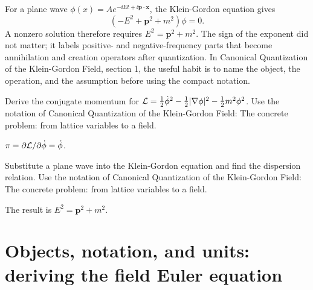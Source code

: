 \begin{example}
For a plane wave \(\phi(x)=Ae^{-\ii Et+\ii\bm p\cdot\bm x}\), the Klein-Gordon equation gives
\[
  (-E^2+\bm p^2+m^2)\phi=0.
\]
A nonzero solution therefore requires \(E^2=\bm p^2+m^2\).  The sign of the exponent did not matter; it labels positive- and negative-frequency parts that become annihilation and creation operators after quantization.  In Canonical Quantization of the Klein-Gordon Field, section 1, the useful habit is to name the object, the operation, and the assumption before using the compact notation.
\end{example}



\begin{exercise}
Derive the conjugate momentum for \(\mathcal L=\frac12\dot\phi^2-\frac12|\nabla\phi|^2-\frac12m^2\phi^2\).  Use the notation of Canonical Quantization of the Klein-Gordon Field: The concrete problem: from lattice variables to a field.
\begin{answer}
\(\pi=\partial\mathcal L/\partial\dot\phi=\dot\phi\).
\end{answer}
\end{exercise}

\begin{exercise}
Substitute a plane wave into the Klein-Gordon equation and find the dispersion relation.  Use the notation of Canonical Quantization of the Klein-Gordon Field: The concrete problem: from lattice variables to a field.
\begin{answer}
The result is \(E^2=\bm p^2+m^2\).
\end{answer}
\end{exercise}



\section{Objects, notation, and units: deriving the field Euler equation}













